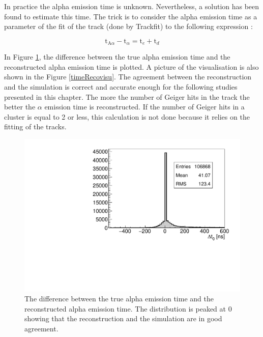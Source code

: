 \documentclass[main.tex]{subfiles}
\begin{document}
\noindent In practice the alpha emission time is unknown. Nevertheless, a solution has been found to estimate this time. The trick is to consider the alpha emission time as a parameter of the fit of the track (done by Trackfit) to the following expression :


$$\text{t}_{\text{A}\alpha} - \text{t}_\alpha =  \text{t}_e  + \text{t}_d$$


\noindent In Figure \ref{timeReco}, the difference between the true alpha emission time and the reconstructed alpha emission time is plotted. A picture of the visualisation is also shown in the Figure \ref{timeRecovisu}. The agreement between the reconstruction and the simulation is correct and accurate enough for the following studies presented in this chapter. The more the number of Geiger hits in the track the better the $\alpha$ emission time is reconstructed. If the number of Geiger hits in a cluster is equal to 2 or less, this calculation is not done because it relies on the fitting of the tracks. 


\begin{figure}[h!]
\begin{center}
\includegraphics[scale=0.55]{pictures/Chap5/delta_time_simu_reco.pdf}
\caption{The difference between the true alpha emission time and the reconstructed alpha emission time. The distribution is peaked at 0 showing that the reconstruction and the simulation are in good agreement.}
\label{timeReco}
\end{center}
\end{figure}
\end{document}
